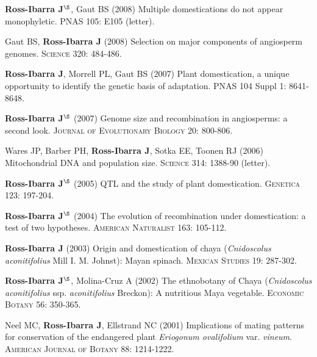 \documentclass[letterpaper]{article}
\begin{document}
\begin{etaremune}
\vspace{-2ex}
\item {\bf Ross-Ibarra J}$^\S$, Gaut BS (2008) Multiple domestications do not appear monophyletic. PNAS 105: E105 (letter).

\vspace{-2ex}
\item Gaut BS, {\bf Ross-Ibarra J} (2008) Selection on major components of angiosperm genomes.  \textsc{Science} 320: 484-486.

\vspace{-2ex}
\item {\bf Ross-Ibarra J}, Morrell PL, Gaut BS (2007) Plant domestication, a unique opportunity to identify the genetic basis of adaptation. PNAS 104 Suppl 1: 8641-8648. 

\vspace{-2ex}
\item {\bf Ross-Ibarra J}$^\S$ (2007) Genome size and recombination in angiosperms: a second look.  \textsc{Journal of Evolutionary Biology} 20: 800-806.

\vspace{-2ex}
\item Wares JP, Barber PH, {\bf Ross-Ibarra J}, Sotka EE, Toonen RJ (2006) Mitochondrial DNA and population size.  \textsc{Science} 314: 1388-90 (letter).

\vspace{-2ex}
\item {\bf Ross-Ibarra J}$^\S$ (2005) QTL and the study of plant domestication.  \textsc{Genetica} 123: 197-204. 

\vspace{-2ex}
\item {\bf Ross-Ibarra J}$^\S$ (2004) The evolution of recombination under domestication: a test of two hypotheses.  \textsc{American Naturalist} 163: 105-112.

\vspace{-2ex}
\item {\bf Ross-Ibarra J} (2003) Origin and domestication of chaya (\emph{Cnidoscolus aconitifolius} Mill I. M. Johnst): Mayan spinach.  \textsc{Mexican Studies} 19: 287-302.

\vspace{-2ex}
\item {\bf Ross-Ibarra J}$^\S$, Molina-Cruz A (2002) The ethnobotany of Chaya (\emph{Cnidoscolus aconitifolius} ssp. \emph{aconitifolius} Breckon): A nutritious Maya vegetable.  \textsc{Economic Botany} 56: 350-365.

\vspace{-2ex}
\item  Neel MC, {\bf Ross-Ibarra J}, Ellstrand NC (2001) Implications of mating patterns for conservation of the endangered plant \emph{Eriogonum ovalifolium} var. \emph{vineum}.  \textsc{American Journal of Botany} 88: 1214-1222.
\end{etaremune}
\end{document}

